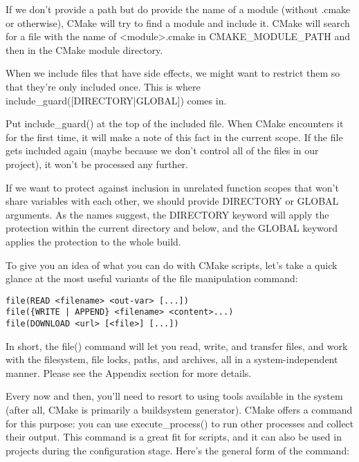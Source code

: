 If we don't provide a path but do provide the name of a module (without .cmake or otherwise), CMake will try to find a module and include it. CMake will search for a file with the name of <module>.cmake in CMAKE\_MODULE\_PATH and then in the CMake module directory.


When we include files that have side effects, we might want to restrict them so that they're only included once. This is where include\_guard([DIRECTORY|GLOBAL]) comes in.

Put include\_guard() at the top of the included file. When CMake encounters it for the first time, it will make a note of this fact in the current scope. If the file gets included again (maybe because we don't control all of the files in our project), it won't be processed any further.

If we want to protect against inclusion in unrelated function scopes that won't share variables with each other, we should provide DIRECTORY or GLOBAL arguments. As the names suggest, the DIRECTORY keyword will apply the protection within the current directory and below, and the GLOBAL keyword applies the protection to the whole build.


To give you an idea of what you can do with CMake scripts, let's take a quick glance at the most useful variants of the file manipulation command:

\begin{lstlisting}[style=styleCMake]
file(READ <filename> <out-var> [...])
file({WRITE | APPEND} <filename> <content>...)
file(DOWNLOAD <url> [<file>] [...])
\end{lstlisting}

In short, the file() command will let you read, write, and transfer files, and work with the filesystem, file locks, paths, and archives, all in a system-independent manner. Please see the Appendix section for more details.


Every now and then, you'll need to resort to using tools available in the system (after all, CMake is primarily a buildsystem generator). CMake offers a command for this purpose: you can use execute\_process() to run other processes and collect their output. This command is a great fit for scripts, and it can also be used in projects during the configuration stage. Here's the general form of the command:

